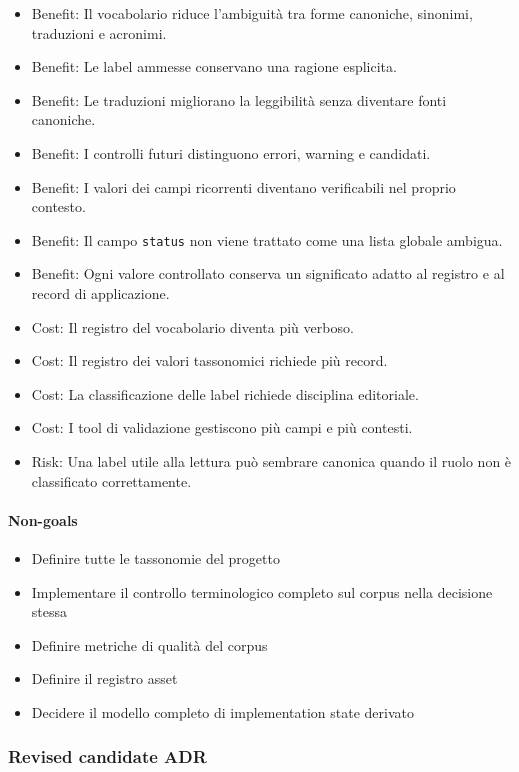 \documentclass[
  10pt,
]{article}
\providecommand{\tightlist}{%
  \setlength{\itemsep}{0pt}\setlength{\parskip}{0pt}}
\begin{document}
\begin{itemize}
\tightlist
\item
  Benefit: Il vocabolario riduce l'ambiguità tra forme canoniche,
  sinonimi, traduzioni e acronimi.
\item
  Benefit: Le label ammesse conservano una ragione esplicita.
\item
  Benefit: Le traduzioni migliorano la leggibilità senza diventare fonti
  canoniche.
\item
  Benefit: I controlli futuri distinguono errori, warning e candidati.
\item
  Benefit: I valori dei campi ricorrenti diventano verificabili nel
  proprio contesto.
\item
  Benefit: Il campo \texttt{status} non viene trattato come una lista
  globale ambigua.
\item
  Benefit: Ogni valore controllato conserva un significato adatto al
  registro e al record di applicazione.
\item
  Cost: Il registro del vocabolario diventa più verboso.
\item
  Cost: Il registro dei valori tassonomici richiede più record.
\item
  Cost: La classificazione delle label richiede disciplina editoriale.
\item
  Cost: I tool di validazione gestiscono più campi e più contesti.
\item
  Risk: Una label utile alla lettura può sembrare canonica quando il
  ruolo non è classificato correttamente.
\end{itemize}

\paragraph{Non-goals}\label{non-goals-3}

\begin{itemize}
\tightlist
\item
  Definire tutte le tassonomie del progetto
\item
  Implementare il controllo terminologico completo sul corpus nella
  decisione stessa
\item
  Definire metriche di qualità del corpus
\item
  Definire il registro asset
\item
  Decidere il modello completo di implementation state derivato
\end{itemize}

\subsubsection{Revised candidate ADR}\label{revised-candidate-adr-3}
\end{document}
